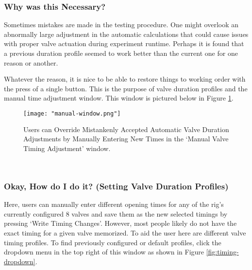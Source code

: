 \documentclass{article}
\begin{document}
\subsubsection{Why was this Necessary?}
Sometimes mistakes are made in the testing procedure. One might overlook an abnormally large adjustment in the automatic calculations that 
could cause issues with proper valve actuation during experiment runtime. Perhaps it is found that a previous duration profile seemed to
work better than the current one for one reason or another. 

Whatever the reason, it is nice to be able to restore things to working order with the press of a single button. This is the purpose of 
valve duration profiles and the manual time adjustment window. This window is pictured below in Figure \ref{fig:manual-window}. 

\begin{figure}[h!]
        \centering
        \texttt{[image: "manual-window.png"]}
        \caption{Users can Override Mistankenly Accepted Automatic Valve Duration Adjustments by Manually Entering New Times in the 
        `Manual Valve Timing Adjustment' window.}
        \label{fig:manual-window}
\end{figure}

\

\subsubsection{Okay, How do I do it? (Setting Valve Duration Profiles)}
Here, users can manually enter different opening times for any of the rig's currently configured 8 valves and save them as the new selected
timings by pressing `Write Timing Changes'. However, most people likely do not have the exact timing for a given valve memorized. To 
aid the user here are different valve timing profiles. To find previously configured or default profiles, click the dropdown menu in the 
top right of this window as shown in Figure \ref{fig:timing-dropdown}.
\end{document}
